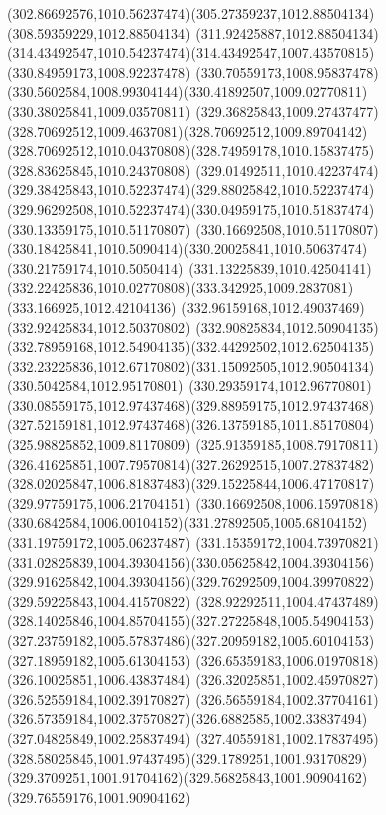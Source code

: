 {{		\curveto(302.86692576,1010.56237474)(305.27359237,1012.88504134)(308.59359229,1012.88504134)
		\curveto(311.92425887,1012.88504134)(314.43492547,1010.54237474)(314.43492547,1007.43570815)
		\moveto(330.84959173,1008.92237478)
		\curveto(330.70559173,1008.95837478)(330.5602584,1008.99304144)(330.41892507,1009.02770811)
		\lineto(330.38025841,1009.03570811)
		\curveto(329.36825843,1009.27437477)(328.70692512,1009.4637081)(328.70692512,1009.89704142)
		\curveto(328.70692512,1010.04370808)(328.74959178,1010.15837475)(328.83625845,1010.24370808)
		\curveto(329.01492511,1010.42237474)(329.38425843,1010.52237474)(329.88025842,1010.52237474)
		\curveto(329.96292508,1010.52237474)(330.04959175,1010.51837474)(330.13359175,1010.51170807)
		\lineto(330.16692508,1010.51170807)
		\curveto(330.18425841,1010.5090414)(330.20025841,1010.50637474)(330.21759174,1010.5050414)
		\curveto(331.13225839,1010.42504141)(332.22425836,1010.02770808)(333.342925,1009.2837081)
		\lineto(333.166925,1012.42104136)
		\lineto(332.96159168,1012.49037469)
		\lineto(332.92425834,1012.50370802)
		\curveto(332.90825834,1012.50904135)(332.78959168,1012.54904135)(332.44292502,1012.62504135)
		\curveto(332.23225836,1012.67170802)(331.15092505,1012.90504134)(330.5042584,1012.95170801)
		\curveto(330.29359174,1012.96770801)(330.08559175,1012.97437468)(329.88959175,1012.97437468)
		\curveto(327.52159181,1012.97437468)(326.13759185,1011.85170804)(325.98825852,1009.81170809)
		\curveto(325.91359185,1008.79170811)(326.41625851,1007.79570814)(327.26292515,1007.27837482)
		\curveto(328.02025847,1006.81837483)(329.15225844,1006.47170817)(329.97759175,1006.21704151)
		\lineto(330.16692508,1006.15970818)
		\curveto(330.6842584,1006.00104152)(331.27892505,1005.68104152)(331.19759172,1005.06237487)
		\curveto(331.15359172,1004.73970821)(331.02825839,1004.39304156)(330.05625842,1004.39304156)
		\curveto(329.91625842,1004.39304156)(329.76292509,1004.39970822)(329.59225843,1004.41570822)
		\curveto(328.92292511,1004.47437489)(328.14025846,1004.85704155)(327.27225848,1005.54904153)
		\curveto(327.23759182,1005.57837486)(327.20959182,1005.60104153)(327.18959182,1005.61304153)
		\lineto(326.65359183,1006.01970818)
		\lineto(326.10025851,1006.43837484)
		\lineto(326.32025851,1002.45970827)
		\lineto(326.52559184,1002.39170827)
		\lineto(326.56559184,1002.37704161)
		\curveto(326.57359184,1002.37570827)(326.6882585,1002.33837494)(327.04825849,1002.25837494)
		\curveto(327.40559181,1002.17837495)(328.58025845,1001.97437495)(329.1789251,1001.93170829)
		\curveto(329.3709251,1001.91704162)(329.56825843,1001.90904162)(329.76559176,1001.90904162)
}}
